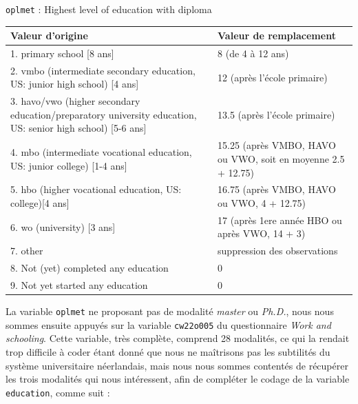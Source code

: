 \documentclass[a4paper, french, 11 pt]{article}\usepackage[]{graphicx}\usepackage[]{xcolor}
\begin{document}
\vspace{0,5cm}
\begin{minipage}{0,8\linewidth}
{\footnotesize\texttt{oplmet} : Highest level of education with diploma
\vspace{0,2cm}

\begin{tabular}{m{0,5\linewidth}m{0,5\linewidth}}
\hline
Valeur d'origine & Valeur de remplacement \\
\hline
1. primary school [8 ans] & 8 (de 4 à 12 ans) \\
2. vmbo (intermediate secondary education, US: junior high school) [4 ans] & 12 (après l'école primaire) \\
3. havo/vwo (higher secondary education/preparatory university education, US: senior high school) [5-6 ans] & 13.5 (après l'école primaire) \\
4. mbo (intermediate vocational education, US: junior college) [1-4 ans] & 15.25 (après VMBO, HAVO ou VWO, soit en moyenne 2.5 + 12.75)\\
5. hbo (higher vocational education, US: college)[4 ans] & 16.75 (après VMBO, HAVO ou VWO, 4 + 12.75)\\
6. wo (university) [3 ans]& 17 (après 1ere année HBO ou après VWO, 14 + 3)\\
7. other & suppression des observations \\
8. Not (yet) completed any education & 0 \\
9. Not yet started any education & 0 \\
\hline
\end{tabular}}
\end{minipage}
\vspace{0,3cm}

La variable \texttt{oplmet} ne proposant pas de modalité \textit{master} ou \textit{Ph.D.}, nous nous sommes ensuite appuyés sur la variable \texttt{cw22o005} du questionnaire \textit{Work and schooling}. Cette variable, très complète, comprend 28 modalités, ce qui la rendait trop difficile à coder étant donné que nous ne maîtrisons pas les subtilités du système universitaire néerlandais, mais nous nous sommes contentés de récupérer les trois modalités qui nous intéressent, afin de compléter le codage de la variable \texttt{education}, comme suit : 
\end{document}
